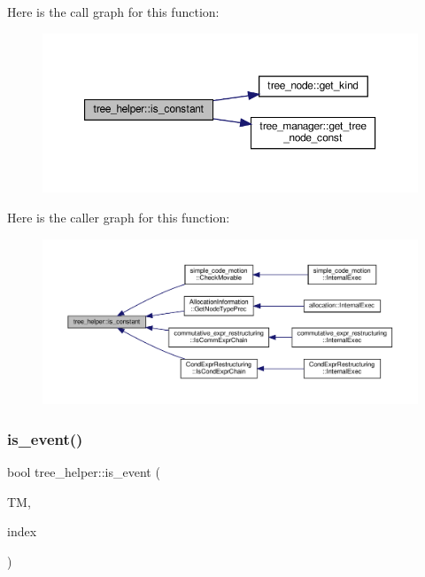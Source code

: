 Here is the call graph for this function\+:
\nopagebreak
\begin{figure}[H]
\begin{center}
\leavevmode
\includegraphics[width=350pt]{d7/d99/classtree__helper_a2a4c47da4a2b504b5700a9f3ee5e9463_cgraph}
\end{center}
\end{figure}
Here is the caller graph for this function\+:
\nopagebreak
\begin{figure}[H]
\begin{center}
\leavevmode
\includegraphics[width=350pt]{d7/d99/classtree__helper_a2a4c47da4a2b504b5700a9f3ee5e9463_icgraph}
\end{center}
\end{figure}
\mbox{\label{classtree__helper_a0519f8236f1ff74d770b5d238d7c6c98}} 
\subsubsection{\texorpdfstring{is\+\_\+event()}{is\_event()}}
{\footnotesize\ttfamily bool tree\+\_\+helper\+::is\+\_\+event (\begin{DoxyParamCaption}\item[{const \hyperlink{tree__manager_8hpp_a792e3f1f892d7d997a8d8a4a12e39346}{tree\+\_\+manager\+Const\+Ref} \&}]{TM,  }\item[{const unsigned int}]{index }\end{DoxyParamCaption})\hspace{0.3cm}{\ttfamily [static]}}



